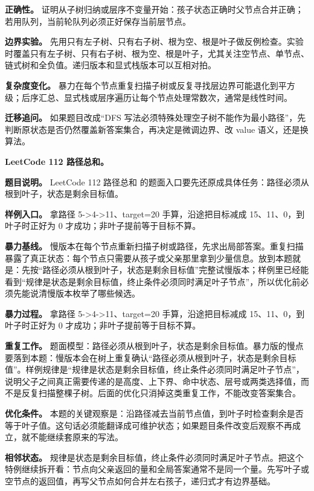 \textbf{正确性。} 证明从子树归纳或层序不变量开始：孩子状态正确时父节点合并正确；若用队列，当前轮队列必须正好保存当前层节点。

\textbf{边界实验。} 先用只有左子树、只有右子树、根为空、根是叶子做反例检查。实验时覆盖只有左子树、只有右子树、根为空、根是叶子，尤其关注空节点、单节点、链式树和全负值。递归版本和显式栈版本可以互相对拍。

\textbf{复杂度变化。} 暴力在每个节点重复扫描子树或反复寻找层边界可能退化到平方级；后序汇总、显式栈或层序遍历让每个节点处理常数次，通常是线性时间。

\textbf{迁移追问。} 如果题目改成“DFS 写法必须特殊处理空子树不能作为最小路径”，先判断原状态是否仍然覆盖新答案集合，再决定是微调边界、改 value 语义，还是换算法。

\noindent\textbf{LeetCode 112 路径总和。}

\textbf{题目说明。} LeetCode 112 路径总和 的题面入口要先还原成具体任务：路径必须从根到叶子，状态是剩余目标值。

\textbf{样例入口。} 拿路径 5->4->11、target=20 手算，沿途把目标减成 15、11、0，到叶子时正好为 0 才成功；非叶子提前等于目标不算。

\textbf{暴力基线。} 慢版本在每个节点重新扫描子树或路径，先求出局部答案。重复扫描暴露了真正状态：每个节点只需要从孩子或父亲那里拿到少量信息。放到本题就是：先按“路径必须从根到叶子，状态是剩余目标值”完整试慢版本；样例里已经能看到“规律是状态是剩余目标值，终止条件必须同时满足叶子节点”，所以优化前必须先能说清慢版本枚举了哪些候选。

\textbf{暴力过程。} 拿路径 5->4->11、target=20 手算，沿途把目标减成 15、11、0，到叶子时正好为 0 才成功；非叶子提前等于目标不算。

\textbf{重复工作。} 题面模型：路径必须从根到叶子，状态是剩余目标值。暴力版的慢点要落到本题：慢版本会在树上重复确认“路径必须从根到叶子，状态是剩余目标值”。样例规律是“规律是状态是剩余目标值，终止条件必须同时满足叶子节点”，说明父子之间真正需要传递的是高度、上下界、命中状态、层号或两类选择值，而不是反复扫描整棵子树。后面的优化只消掉这类重复工作，不能改变答案集合。

\textbf{优化条件。} 本题的关键观察是：沿路径减去当前节点值，到叶子时检查剩余是否等于叶子值。这句话必须能翻译成可维护状态；如果题目条件改变后观察不再成立，就不能继续套原来的写法。

\textbf{相邻状态。} 规律是状态是剩余目标值，终止条件必须同时满足叶子节点。把这个特例继续拆开看：节点向父亲返回的量和全局答案通常不是同一个量。先写叶子或空节点的返回值，再写父节点如何合并左右孩子，递归式才有边界基础。

